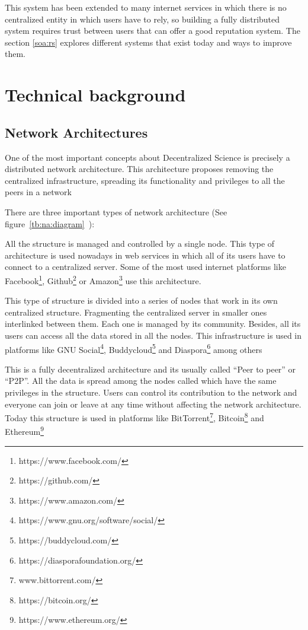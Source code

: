 This system has been extended to many internet services in which there is no
centralized entity in which users have to rely, so building a fully distributed
system requires trust between users that can offer a good reputation system. The
section \ref{soa:rs} explores different systems that exist today and ways to
improve them.

\section{Technical background}
\label{tb}
\subsection{Network Architectures}
\label{tb:na}

One of the most important concepts about Decentralized Science is precisely a
distributed network architecture. This architecture proposes removing the
centralized infrastructure, spreading its functionality and privileges to all
the peers in a network

There are three important types of network architecture (See
figure~\ref{tb:na:diagram}~\cite{baran1964distributed}):

\begin{itemize}
   All the structure is managed and controlled
  by a single node. This type of architecture is used nowadays in web services
  in which all of its users have to connect to a centralized server. Some of the
  most used internet platforms like
  Facebook\footnote{https://www.facebook.com/},
  Github\footnote{https://github.com/} or
  Amazon\footnote{https://www.amazon.com/} use this architecture.

  
   This type of structure is divided into a
  series of nodes that work in its own centralized structure. Fragmenting the
  centralized server in smaller ones interlinked between them. Each one is
  managed by its community. Besides, all its users can access all the data
  stored in all the nodes. This infrastructure is used in platforms like GNU
  Social\footnote{https://www.gnu.org/software/social/},
  Buddycloud\footnote{https://buddycloud.com/} and
  Diaspora\footnote{https://diasporafoundation.org/} among others

   This is a fully decentralized architecture
  and its usually called ``Peer to peer'' or ``P2P''. All the data is spread
  among the nodes called  which have the same privileges in the
  structure. Users can control its contribution to the network and everyone can
  join or leave at any time without affecting the network architecture. Today
  this structure is used in platforms like
  BitTorrent\footnote{www.bittorrent.com/},
  Bitcoin\footnote{https://bitcoin.org/} and
  Ethereum\footnote{https://www.ethereum.org/}
\end{itemize}


